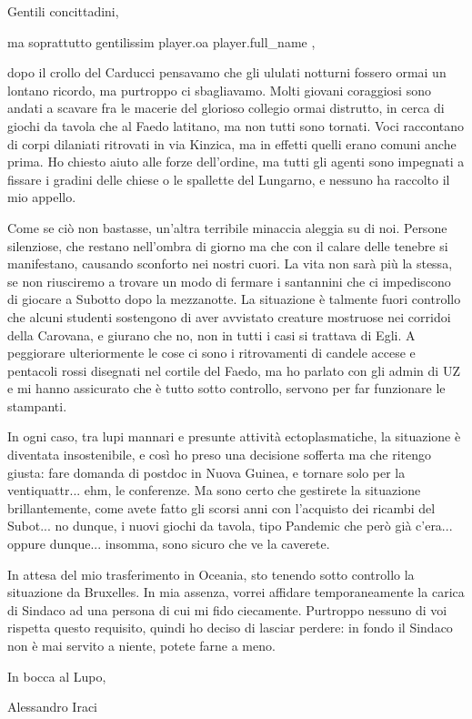 \documentclass{letter}
\date{28 febbraio 2018}
\begin{document}
\begin{letter}{}
\opening{Gentili concittadini,}

ma soprattutto gentilissim{{ player.oa }} {{ player.full_name }},

dopo il crollo del Carducci pensavamo che gli ululati notturni fossero ormai un lontano ricordo, ma purtroppo ci sbagliavamo. Molti giovani coraggiosi sono andati a scavare fra le macerie del glorioso collegio ormai distrutto, in cerca di giochi da tavola che al Faedo latitano, ma non tutti sono tornati. Voci raccontano di corpi dilaniati ritrovati in via Kinzica, ma in effetti quelli erano comuni anche prima. Ho chiesto aiuto alle forze dell'ordine, ma tutti gli agenti sono impegnati a fissare i gradini delle chiese o le spallette del Lungarno, e nessuno ha raccolto il mio appello.

Come se ciò non bastasse, un'altra terribile minaccia aleggia su di noi. Persone silenziose, che restano nell'ombra di giorno ma che con il calare delle tenebre si manifestano, causando sconforto nei nostri cuori. La vita non sarà più la stessa, se non riusciremo a trovare un modo di fermare i santannini che ci impediscono di giocare a Subotto dopo la mezzanotte. La situazione è talmente fuori controllo che alcuni studenti sostengono di aver avvistato creature mostruose nei corridoi della Carovana, e giurano che no, non in tutti i casi si trattava di Egli. A peggiorare ulteriormente le cose ci sono i ritrovamenti di candele accese e pentacoli rossi disegnati nel cortile del Faedo, ma ho parlato con gli admin di UZ e mi hanno assicurato che è tutto sotto controllo, servono per far funzionare le stampanti.

In ogni caso, tra lupi mannari e presunte attività ectoplasmatiche, la situazione è diventata insostenibile, e così ho preso una decisione sofferta ma che ritengo giusta: fare domanda di postdoc in Nuova Guinea, e tornare solo per la ventiquattr... ehm, le conferenze. Ma sono certo che gestirete la situazione brillantemente, come avete fatto gli scorsi anni con l'acquisto dei ricambi del Subot... no dunque, i nuovi giochi da tavola, tipo Pandemic che però già c'era... oppure dunque... insomma, sono sicuro che ve la caverete.

In attesa del mio trasferimento in Oceania, sto tenendo sotto controllo la situazione da Bruxelles. In mia assenza, vorrei affidare temporaneamente la carica di Sindaco ad una persona di cui mi fido ciecamente. Purtroppo nessuno di voi rispetta questo requisito, quindi ho deciso di lasciar perdere: in fondo il Sindaco non è mai servito a niente, potete farne a meno.

In bocca al Lupo,

\bigskip

\noindent Alessandro Iraci

\end{letter}
\end{document}
